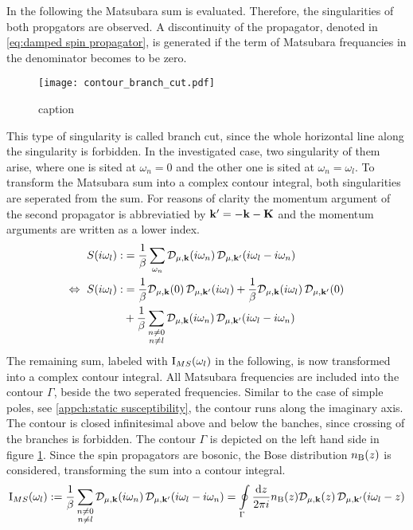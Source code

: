 %
In the following the Matsubara sum is evaluated.
Therefore, the singularities of both propgators are observed.
A discontinuity of the propagator, denoted in \eqref{eq:damped spin propagator}, is generated if the term of Matsubara frequancies in the denominator becomes to be zero.
%
\begin{figure}[t]
	\centering
	\texttt{[image: contour\_branch\_cut.pdf]}
	\caption{caption}
	\label{fig:contour branch cut}
\end{figure}
%
This type of singularity is called branch cut, since the whole horizontal line along the singularity is forbidden.
In the investigated case, two singularity of them arise, where one is sited at $\omega_{n} = 0$ and the other one is sited at $\omega_{n} = \omega_{l}$.
To transform the Matsubara sum into a complex contour integral, both singularities are seperated from the sum.
For reasons of clarity the momentum argument of the second propagator is abbreviatied by $\vb{k}'=-\vb{k}-\vb{K}$ and the momentum arguments are written as a lower index.
%
\begin{align}
	S(i\omega_{l}) :&= \frac{1}{\beta} \sum\limits_{\omega_{n}} \mathcal{D}_{\mu,\vb{k}}(i\omega_{n}) \, \mathcal{D}_{\mu,\vb{k}'}(i\omega_{l}-i\omega_{n})
	\notag \\
	\Leftrightarrow\ S(i\omega_{l}) :&= 
		\frac{1}{\beta} \mathcal{D}_{\mu,\vb{k}}(0) \, \mathcal{D}_{\mu,\vb{k}'}(i\omega_{l})
		+
		\frac{1}{\beta} \mathcal{D}_{\mu,\vb{k}}(i\omega_{l}) \, \mathcal{D}_{\mu,\vb{k}'}(0)
		\notag \\
		&+
		\frac{1}{\beta} \sum\limits_{\substack{n \neq 0 \\ n \neq l}} \mathcal{D}_{\mu,\vb{k}}(i\omega_{n}) \, \mathcal{D}_{\mu,\vb{k}'}(i\omega_{l}-i\omega_{n})
	\label{appeq:seperated Matsubara sum}
\end{align}
%
The remaining sum, labeled with $\mathrm{I}_{MS}(\omega_{l})$ in the following, is now transformed into a complex contour integral.
All Matsubara frequencies are included into the contour $\Gamma$, beside the two seperated frequencies.
Similar to the case of simple poles, see \ref{appch:static susceptibility}, the contour runs along the imaginary axis.
The contour is closed infinitesimal above and below the banches, since crossing of the branches is forbidden.
The contour $\Gamma$ is depicted on the left hand side in figure \ref{fig:contour branch cut}.
Since the spin propagators are bosonic, the Bose distribution $n_{\mathrm{B}}(z)$ is considered, transforming the sum into a contour integral.
%
\begin{align}
	\mathrm{I}_{MS}(\omega_{l}) := 
		\frac{1}{\beta} \sum\limits_{\substack{n \neq 0 \\ n \neq l}} \mathcal{D}_{\mu,\vb{k}}(i\omega_{n}) \, \mathcal{D}_{\mu,\vb{k}'}(i\omega_{l}-i\omega_{n})
		=
		\oint\limits_{\Gamma} \frac{\dd{z}}{2\pi i} n_{\mathrm{B}}(z) \mathcal{D}_{\mu,\vb{k}}(z) \, \mathcal{D}_{\mu,\vb{k}'}(i\omega_{l}-z)
\end{align}
